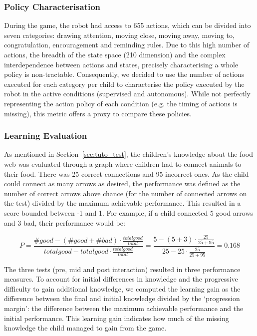\subsubsection{Policy Characterisation}

During the game, the robot had access to 655 actions, which can be divided into seven categories: drawing attention, moving close, moving away, moving to, congratulation, encouragement and reminding rules. Due to this high number of actions, the breadth of the state space (210 dimension) and the complex interdependence between actions and states, precisely characterising a whole policy is non-tractable. Consequently, we decided to use the number of actions executed for each category per child to characterise the policy executed by the robot in the active conditions (supervised and autonomous). While not perfectly representing the action policy of each condition (e.g. the timing of actions is missing), this metric offers a proxy to compare these policies. 

\subsubsection{Learning Evaluation} \label{sec:tuto_perf}

As mentioned in Section~\ref{sec:tuto_test}, the children's knowledge about the food web was evaluated through a graph where children had to connect animals to their food. There was 25 correct connections and 95 incorrect ones. As the child could connect as many arrows as desired, the performance was defined as the number of correct arrows above chance (for the number of connected arrows on the test) divided by the maximum achievable performance. This resulted in a score bounded between -1 and 1. For example, if a child connected 5 good arrows and 3 bad, their performance would be:

\begin{equation}
P=\frac{\#good-(\#good+\#bad) \cdot \frac{total good}{total}}{total good - total good \cdot \frac{total good}{total}} = \frac{5-(5+3) \cdot \frac{25}{25+95}}{25 - 25 \cdot \frac{25}{25+95}}=0.168
\end{equation}
			
The three tests (pre, mid and post interaction) resulted in three performance measures. To account for initial differences in knowledge and the progressive difficulty to gain additional knowledge, we computed the learning gain as the difference between the final and initial knowledge divided by the `progression margin': the difference between the maximum achievable performance and the initial performance. This learning gain indicates how much of the missing knowledge the child managed to gain from the game.
			
